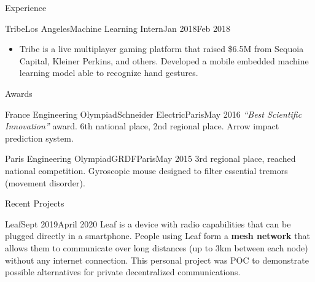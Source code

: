 \documentclass{resume}
\begin{document}
\begin{rSection}{Experience}
		\begin{job}{Tribe}{Los Angeles}{Machine Learning Intern}{Jan 2018}{Feb 2018}{
            \begin{itemize}
                \item Tribe is a live multiplayer gaming platform that raised \$6.5M from Sequoia Capital, Kleiner Perkins, and others. Developed a mobile embedded machine learning model able to recognize hand gestures.
            \end{itemize}
		}
		\end{job}
	\end{rSection}

	\begin{rSection}{Awards} \itemsep -2pt
		\begin{award}{France Engineering Olympiad}{Schneider Electric}{Paris}{May 2016}{
				{\em \textquotedblleft Best Scientific Innovation\textquotedblright} award. 6th national place, 2nd regional place. Arrow impact prediction system.
			}
		\end{award}

		\begin{award}{Paris Engineering Olympiad}{GRDF}{Paris}{May 2015}{
				3rd regional place, reached national competition. Gyroscopic mouse designed to filter essential tremors (movement disorder).
			}
		\end{award}
	\end{rSection}

    \begin{rSection}{Recent Projects}
        \begin{project}{Leaf}{Sept 2019}{April 2020}{
            Leaf is a device with radio capabilities that can be plugged directly in a smartphone. People using Leaf form a \textbf{mesh network} that allows them to communicate over long distances (up to 3km between each node) without any internet connection. This personal project was POC to demonstrate possible alternatives for private decentralized communications.
        }
        \end{project}
    \end{rSection}
\end{document}
